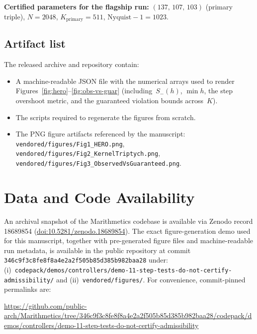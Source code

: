 \documentclass[11pt,a4paper]{article}
\theoremstyle{plain}
\theoremstyle{definition}
\theoremstyle{plain}
\newcommand{\Sminus}{S_{-}}
\begin{document}
\medskip
\noindent
\textbf{Certified parameters for the flagship run:}
$(137,\, 107,\, 103)$ (primary triple),
$N = 2048$,
$K_{\mathrm{primary}} = 511$,
$\mathrm{Nyquist}-1 = 1023$.


\subsection{Artifact list}

The released archive and repository contain:

\begin{itemize}[leftmargin=2em]
  \item A machine-readable JSON file with the numerical arrays used to render
    Figures~\ref{fig:hero}--\ref{fig:obs-vs-guar} (including~$\Sminus(h)$,
    $\min h$, the step overshoot metric, and the guaranteed violation bounds
    across~$K$).
  \item The scripts required to regenerate the figures from scratch.
  \item The PNG figure artifacts referenced by the manuscript:
    \texttt{vendored/figures/Fig1\_HERO.png},
    \texttt{vendored/figures/Fig2\_KernelTriptych.png},
    \texttt{vendored/figures/Fig3\_ObservedVsGuaranteed.png}.
\end{itemize}


\section*{Data and Code Availability}
\label{sec:data-avail}

An archival snapshot of the Marithmetics codebase is available via Zenodo record
18689854
(\href{https://doi.org/10.5281/zenodo.18689854}{doi:10.5281/zenodo.18689854}).
The exact figure-generation demo used for this manuscript, together with
pre-generated figure files and machine-readable run metadata, is available in the
public repository at commit
\texttt{346c9f3c8fe8f8a4e2a2f505b85d385b982baa28} under:
(i)~\texttt{codepack/demos/controllers/demo-11-step-tests-do-not-certify-%
admissibility/}
and
(ii)~\texttt{vendored/figures/}.
For convenience, commit-pinned permalinks are:

\smallskip
\noindent
\url{https://github.com/public-arch/Marithmetics/tree/346c9f3c8fe8f8a4e2a2f505b85d385b982baa28/codepack/demos/controllers/demo-11-step-tests-do-not-certify-admissibility}
\end{document}
